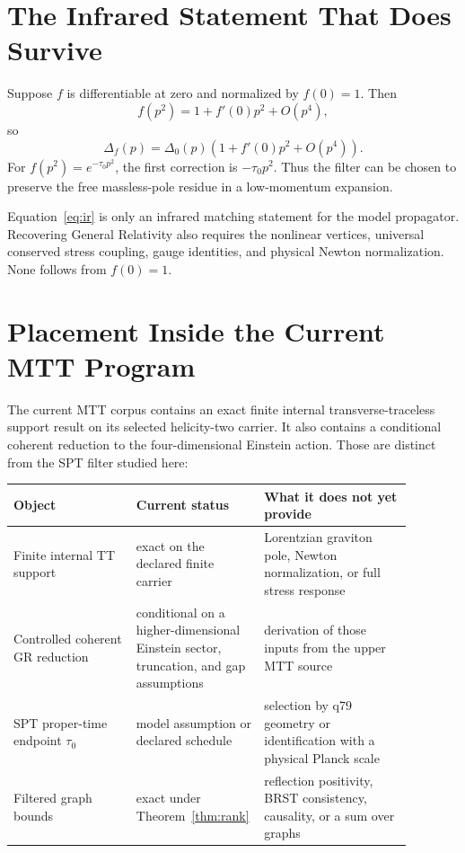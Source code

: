 \documentclass[11pt]{article}
\begin{document}
\section{The Infrared Statement That Does Survive}

Suppose \(f\) is differentiable at zero and normalized by \(f(0)=1\). Then
\[
 f(p^2)=1+f'(0)p^2+O(p^4),
\]
so
\begin{equation}
 \Delta_f(p)
 =\Delta_0(p)\left(1+f'(0)p^2+O(p^4)\right).
 \label{eq:ir}
\end{equation}
For \(f(p^2)=e^{-\tau_0p^2}\), the first correction is
\(-\tau_0p^2\). Thus the filter can be chosen to preserve the free
massless-pole residue in a low-momentum expansion.

Equation~\eqref{eq:ir} is only an infrared matching statement for the model
propagator. Recovering General Relativity also requires the nonlinear
vertices, universal conserved stress coupling, gauge identities, and
physical Newton normalization. None follows from \(f(0)=1\).

\section{Placement Inside the Current MTT Program}

The current MTT corpus contains an exact finite internal transverse-traceless
support result on its selected helicity-two carrier. It also contains a
conditional coherent reduction to the four-dimensional Einstein action.
Those are distinct from the SPT filter studied here:
\begin{center}
\begin{tabular}{p{0.30\linewidth}p{0.22\linewidth}p{0.36\linewidth}}
\toprule
Object & Current status & What it does not yet provide\\
\midrule
Finite internal TT support & exact on the declared finite carrier &
Lorentzian graviton pole, Newton normalization, or full stress response\\
Controlled coherent GR reduction & conditional on a higher-dimensional
Einstein sector, truncation, and gap assumptions & derivation of those
inputs from the upper MTT source\\
SPT proper-time endpoint \(\tau_0\) & model assumption or declared schedule &
selection by q79 geometry or identification with a physical Planck scale\\
Filtered graph bounds & exact under Theorem~\ref{thm:rank} &
reflection positivity, BRST consistency, causality, or a sum over graphs\\
\bottomrule
\end{tabular}
\end{center}
\end{document}
